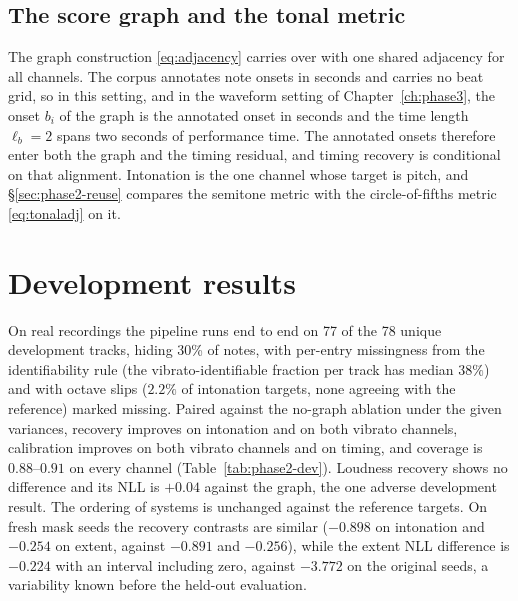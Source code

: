 \documentclass[11pt,a4paper]{report}
\begin{document}
\subsection{The score graph and the tonal metric}
The graph construction \eqref{eq:adjacency} carries over with one shared
adjacency for all channels. The corpus annotates note onsets in seconds and
carries no beat grid, so in this setting, and in the waveform setting of
Chapter~\ref{ch:phase3}, the onset $b_i$ of the graph is the annotated onset
in seconds and the time length $\ell_b = 2$ spans two seconds of
performance time. The annotated onsets therefore enter both the graph and
the timing residual, and timing recovery is conditional on that alignment.
Intonation is the one channel whose target is pitch, and
\S\ref{sec:phase2-reuse} compares the semitone metric with the
circle-of-fifths metric \eqref{eq:tonaladj} on it.

\section{Development results}\label{sec:phase2-devres}
\label{sec:phase2-real}
On real recordings the pipeline runs end to end on 77 of the 78 unique
development tracks, hiding 30\% of notes, with per-entry missingness from
the identifiability rule (the vibrato-identifiable fraction per track has
median $38\%$) and with octave slips ($2.2\%$ of intonation targets, none
agreeing with the reference) marked missing. Paired against the no-graph
ablation under the given variances, recovery improves on intonation and on
both vibrato channels, calibration improves on both vibrato channels and on
timing, and coverage is $0.88$--$0.91$ on every channel
(Table~\ref{tab:phase2-dev}). Loudness recovery shows no difference and its
NLL is $+0.04$ against the graph, the one adverse development result. The
ordering of systems is unchanged against the reference targets. On fresh
mask seeds the recovery contrasts are similar ($-0.898$ on intonation and
$-0.254$ on extent, against $-0.891$ and $-0.256$), while the extent NLL
difference is $-0.224$ with an interval including zero, against $-3.772$ on
the original seeds, a variability known before the held-out evaluation.
\end{document}
